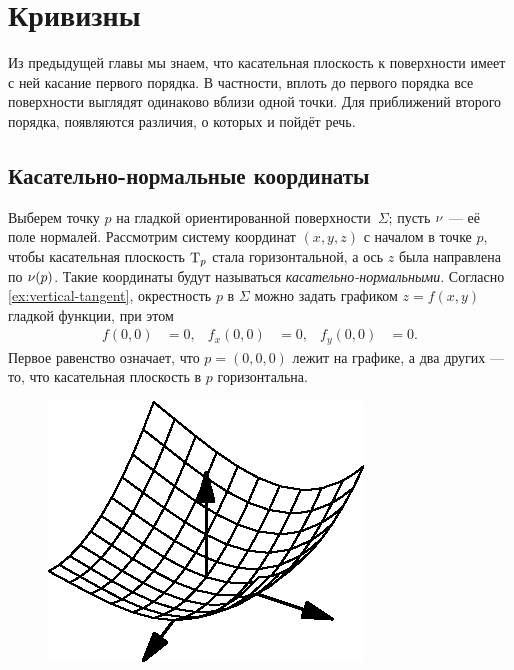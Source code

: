 \chapter{Кривизны}
\label{chap:surface-curvature}

Из предыдущей главы мы знаем, что касательная плоскость к поверхности имеет с ней касание первого порядка.
В частности, вплоть до первого порядка все поверхности выглядят одинаково вблизи одной точки.
Для приближений второго порядка, появляются различия, о которых и пойдёт речь.


\section{Касательно-нормальные координаты}
\label{sec:lmn}

{\sloppy

Выберем точку $p$ на гладкой ориентированной поверхности~$\Sigma$;
пусть $\nu$ --- её поле нормалей.
Рассмотрим систему координат $(x,y,z)$ с началом в точке $p$, чтобы касательная плоскость $\mathrm{T}_p$ стала горизонтальной, а ось $z$ была направлена по $\nu(p)$.
Такие координаты будут называться {}\emph{касательно-нормальными}. 
Согласно \ref{ex:vertical-tangent},
окрестность $p$ в $\Sigma$ можно задать графиком $z=f(x,y)$ гладкой функции,
при этом
\begin{align*}
f(0,0)&=0,
&
f_x(0,0)&=0,
&
f_y(0,0)&=0.
\end{align*}
Первое равенство означает, что $p=(0,0,0)$ лежит на графике, а два других --- то, что касательная плоскость в $p$ горизонтальна.

}

\begin{figure}
\vskip-3mm
\centering
\includegraphics{asy/paraboloid}
\vskip-3mm
\end{figure}

